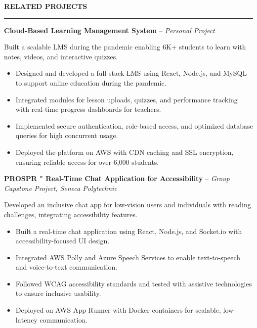 \documentclass[10pt,letterpaper]{article}
\begin{document}
\vspace{6pt}

\textbf{RELATED PROJECTS}\\[-8pt]
\noindent\rule{\textwidth}{1pt}

\vspace{-2pt}

\textbf{Cloud-Based Learning Management System} -- \emph{Personal Project}

\vspace{-1pt}

Built a scalable LMS during the pandemic enabling 6K+ students to learn with notes, videos, and interactive quizzes.
\vspace{-1pt}
\begin{itemize}
\item Designed and developed a full stack LMS using React, Node.js, and MySQL to support online education during the pandemic.
\item Integrated modules for lesson uploads, quizzes, and performance tracking with real-time progress dashboards for teachers.
\item Implemented secure authentication, role-based access, and optimized database queries for high concurrent usage.
\item Deployed the platform on AWS with CDN caching and SSL encryption, ensuring reliable access for over 6,000 students.
\end{itemize}

\textbf{PROSPR " Real-Time Chat Application for Accessibility} -- \emph{Group Capstone Project, Seneca Polytechnic}

\vspace{-1pt}

Developed an inclusive chat app for low-vision users and individuals with reading challenges, integrating accessibility features.
\vspace{-1pt}
\begin{itemize}
\item Built a real-time chat application using React, Node.js, and Socket.io with accessibility-focused UI design.
\item Integrated AWS Polly and Azure Speech Services to enable text-to-speech and voice-to-text communication.
\item Followed WCAG accessibility standards and tested with assistive technologies to ensure inclusive usability.
\item Deployed on AWS App Runner with Docker containers for scalable, low-latency communication.
\end{itemize}
\end{document}
